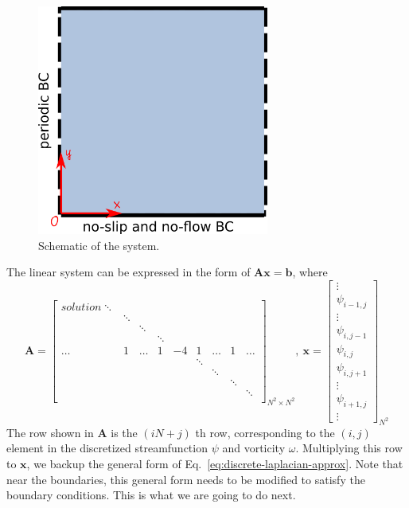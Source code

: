 \documentclass[onecolumn,aps, pre,amsmath,amssymb,longbibliography,11pt]{revtex4-2}
\begin{document}
%
\begin{figure}[h]
\begin{center}
\includegraphics[width=3in]{Figures/schematic.svg.png}
\caption[Schematic]
{
Schematic of the system.
}
\label{fig:schematic}
\end{center}
\end{figure}
%
The linear system can be expressed in the form of $\bm{Ax}=\bm{b}$, where
\begin{equation}\label{eq:linear-system}
\bm{A} = \begin{bmatrix}solution
    \ddots & & & & & & & &  \\
           & \ddots & & & & & & &  \\
           & & \ddots & & & & & &  \\
           & & & \ddots & & & & &  \\
    \dots & 1 & \dots & 1 & -4 & 1 & \dots & 1 & \dots \\ %
    & & & & & \ddots & & &  \\
    & & & & & & \ddots & &  \\
    & & & & & & & \ddots &  \\
    & & & & & & & & \ddots \\
  \end{bmatrix}_{N^2\times N^2}
    , \
\bm{x} = \begin{bmatrix}
    \vdots \\
    \psi_{i-1, j} \\
    \vdots \\
    \psi_{i, j-1} \\
    \psi_{i, j} \\
    \psi_{i, j+1} \\
    \vdots \\
    \psi_{i+1, j} \\
    \vdots
  \end{bmatrix}_{N^2}
\end{equation}
%
The row shown in $\bm{A}$ is the $(iN+j)$ th row, corresponding to the $(i, j)$ element in the discretized streamfunction $\psi$ and vorticity $\omega$. Multiplying this row to $\bm{x}$, we backup the general form of Eq.~\ref{eq:discrete-laplacian-approx}. Note that near the boundaries, this general form needs to be modified to satisfy the boundary conditions. This is what we are going to do next.
\end{document}
